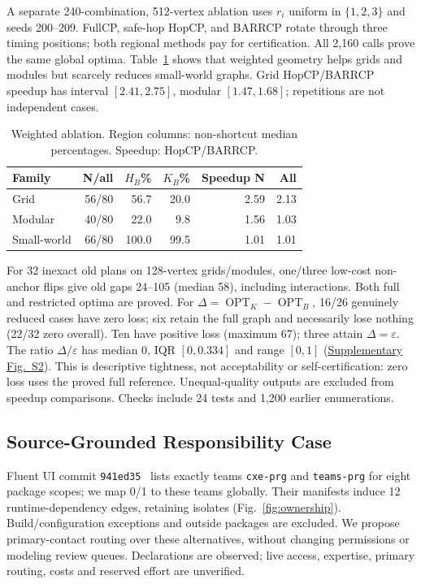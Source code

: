 \documentclass[conference]{IEEEtran}
\newcommand{\opt}{\operatorname{OPT}}
\newcommand{\eps}{\varepsilon}
\begin{document}
A separate 240-combination, 512-vertex ablation uses $r_i$ uniform in $\{1,2,3\}$ and seeds 200--209. FullCP, safe-hop HopCP, and BARRCP rotate through three timing positions; both regional methods pay for certification. All 2,160 calls prove the same global optima. Table~\ref{tab:ablation} shows that weighted geometry helps grids and modules but scarcely reduces small-world graphs. Grid HopCP/BARRCP speedup has interval $[2.41,2.75]$, modular $[1.47,1.68]$; repetitions are not independent cases.

\begin{table}[t]
\caption{Weighted ablation. Region columns: non-shortcut median percentages. Speedup: HopCP/BARRCP.}\label{tab:ablation}
\centering\footnotesize
\begin{tabular}{@{}lrrrrr@{}}
\toprule Family & N/all & $H_B$\% & $K_B$\% & Speedup N & All\\\midrule
Grid & 56/80 & 56.7 & 20.0 & 2.59 & 2.13 \\
Modular & 40/80 & 22.0 & 9.8 & 1.56 & 1.03 \\
Small-world & 66/80 & 100.0 & 99.5 & 1.01 & 1.01 \\
\bottomrule\end{tabular}
\end{table}

For 32 inexact old plans on 128-vertex grids/modules, one/three low-cost non-anchor flips give old gaps 24--105 (median 58), including interactions. Both full and restricted optima are proved. For $\Delta=\opt_K-\opt_B$, 16/26 genuinely reduced cases have zero loss; six retain the full graph and necessarily lose nothing (22/32 zero overall). Ten have positive loss (maximum 67); three attain $\Delta=\eps$. The ratio $\Delta/\eps$ has median 0, IQR $[0,0.334]$ and range $[0,1]$ (\href{https://github.com/elexlebron-spec/cscwd-11/blob/main/paper/supplementary/BARR_Analysis_Supplement.pdf}{Supplementary Fig.~S2}). This is descriptive tightness, not acceptability or self-certification: zero loss uses the proved full reference. Unequal-quality outputs are excluded from speedup comparisons. Checks include 24 tests and 1,200 earlier enumerations.

\subsection{Source-Grounded Responsibility Case}
Fluent UI commit \texttt{941ed35}~\cite{fluentuiowners} lists exactly teams \texttt{cxe-prg} and \texttt{teams-prg} for eight package scopes; we map 0/1 to these teams globally. Their manifests induce 12 runtime-dependency edges, retaining isolates (Fig.~\ref{fig:ownership}). Build/configuration exceptions and outside packages are excluded. We propose primary-contact routing over these alternatives, without changing permissions or modeling review queues. Declarations are observed; live access, expertise, primary routing, costs and reserved effort are unverified.
\end{document}
